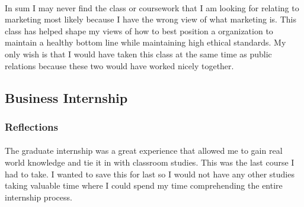 \documentclass[12pt,titlepage]{article}
\begin{document}
\paragraph {}
In sum I may never find the class or coursework that I am looking for relating to marketing most likely because I have the wrong view of what marketing is. This class has helped shape my views of how to best position a organization to maintain a healthy bottom line while maintaining high ethical standards. My only wish is that I would have taken this class at the same time as public relations because these two would have worked nicely together.


\restoregeometry



\restoregeometry

\subsection{Business Internship}
\subsubsection{Reflections}
\paragraph {}
The graduate internship was a great experience that allowed me to gain real world knowledge and tie it in with classroom studies. This was the last course I had to take. I wanted to save this for last so I would not have any other studies taking valuable time where I could spend my time comprehending the entire internship process.
\end{document}

